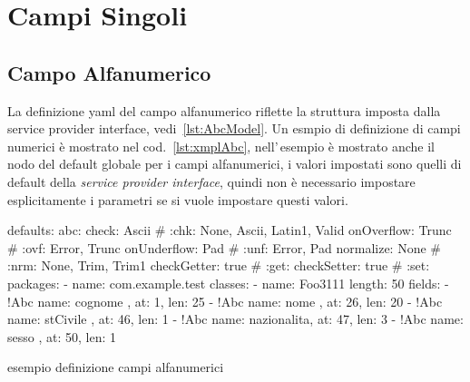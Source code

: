 \documentclass[a4paper,10pt]{report}
\newif\ifesource
\newenvironment{elisting}[1][H]
  {\captionsetup{aboveskip=0pt}\begin{listing}[#1]}
  {\end{listing}%
}
\begin{document}
\section{Campi Singoli}

\subsection{Campo Alfanumerico} \label{sub:yaml.abc}
La definizione yaml del campo alfanumerico riflette la struttura imposta dalla
service provider interface, vedi~\ref{lst:AbcModel}.
Un esmpio di definizione di campi numerici è mostrato nel 
cod.~\ref{lst:xmplAbc}, nell'\,esempio è mostrato anche il nodo del default
globale per i campi alfanumerici, i valori impostati sono quelli di default
della \textsl{service provider interface}, quindi non è necessario impostare
esplicitamente i parametri se si vuole impostare questi valori.

\ifesource
\begin{figure*}[!htb]
\begin{lstlisting}[language=yaml, caption={esempio definizione campi alfanumerici}, 
label=lst:xmplAbc]
defaults:
  abc:
    check: Ascii        # :chk: None, Ascii, Latin1, Valid
    onOverflow: Trunc   # :ovf: Error, Trunc
    onUnderflow: Pad    # :unf: Error, Pad
    normalize: None     # :nrm: None, Trim, Trim1
    checkGetter: true   # :get:
    checkSetter: true   # :set:
packages:
  - name: com.example.test
    classes:
      - name: Foo3111
        length: 50
        fields:
          - !Abc { name: cognome    , at:   1, len:    25 }
          - !Abc { name: nome       , at:  26, len:    20 }
          - !Abc { name: stCivile   , at:  46, len:     1 }
          - !Abc { name: nazionalita, at:  47, len:     3 }
          - !Abc { name: sesso      , at:  50, len:     1 }
\end{lstlisting}
\end{figure*}
\else
\begin{elisting}[!htb]
\begin{yamlcode}
defaults:
  abc:
    check: Ascii        # :chk: None, Ascii, Latin1, Valid
    onOverflow: Trunc   # :ovf: Error, Trunc
    onUnderflow: Pad    # :unf: Error, Pad
    normalize: None     # :nrm: None, Trim, Trim1
    checkGetter: true   # :get:
    checkSetter: true   # :set:
packages:
  - name: com.example.test
    classes:
      - name: Foo3111
        length: 50
        fields:
          - !Abc { name: cognome    , at:   1, len:    25 }
          - !Abc { name: nome       , at:  26, len:    20 }
          - !Abc { name: stCivile   , at:  46, len:     1 }
          - !Abc { name: nazionalita, at:  47, len:     3 }
          - !Abc { name: sesso      , at:  50, len:     1 }
\end{yamlcode}
\caption{esempio definizione campi alfanumerici}
\label{lst:xmplAbc}
\end{elisting}
\fi
\end{document}
